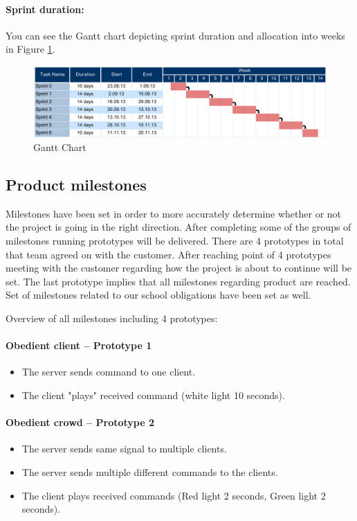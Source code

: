 \paragraph{Sprint duration:}

You can see the Gantt chart depicting sprint duration and allocation into weeks in Figure \ref{fig:gantt}.
\begin{figure}[!h]
	\centering
		\includegraphics[width=18cm, angle=90]{planning/gantt.pdf}
	\caption{Gantt Chart}
	\label{fig:gantt}
\end{figure}

\subsection{Product milestones} \label{txt:planning_productmilestones}
\label{sec:milestones}
Milestones have been set in order to more accurately determine whether or not the project is going in the right direction.
After completing some of the groups of milestones running prototypes will be delivered. 
There are 4 prototypes in total that team agreed on with the customer. 
After reaching point of 4 prototypes meeting with the customer regarding how the project is about to continue will be set. 
The last prototype implies that all milestones regarding product are reached. 
Set of milestones related to our school obligations have been set as well.

 
Overview of all milestones including 4 prototypes:

\paragraph{Obedient client  -- Prototype 1}
\begin{itemize}
	\item The server sends command to one client.
	\item The client "plays" received command (white light 10 seconds).
\end{itemize}

\paragraph{Obedient crowd -- Prototype 2}
\begin{itemize}
	\item The server sends same signal to multiple clients.
	\item The server sends multiple different commands to the clients.
	\item The client plays received commands (Red light 2 seconds, Green light 2 seconds).
\end{itemize}

